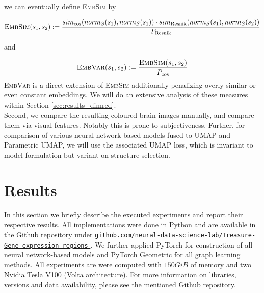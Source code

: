 \documentclass[]{article}
\renewcommand{\cite}{\citep}
\begin{document}
we can eventually define \textsc{EmbSim} by

\begin{equation}
	\label{equ:embsim}
	\textsc{EmbSim}(s_1,s_2):= \frac{sim_\text{cos}(norm_S(s_1), norm_S(s_1)) \cdot sim_\text{Resnik}(norm_S(s_1), norm_S(s_2))}{ P_{\text{Resnik}}}
\end{equation}

and

\begin{equation}
	\label{equ:embvar}
	\textsc{EmbVar}(s_1,s_2):= \frac{\textsc{EmbSim}(s_1, s_2)}{ P_{\text{cos}} }
\end{equation}
\textsc{EmbVar} is a direct extension of \textsc{EmbSim} additionally penalizing overly-similar or even constant embeddings. We will do an extensive analysis of these measures within Section \ref{sec:results_dimred}.\\
Second, we compare the resulting coloured brain images manually, and compare them via visual features. Notably this is prone to subjectiveness.
Further, for comparison of various neural network based models fused to UMAP and Parametric UMAP, we will use the associated UMAP loss, which is invariant to model formulation but variant on structure selection.



\newpage
\section{Results}
\label{sec:results}
In this section we briefly describe the executed experiments and report their respective results. All implementations were done in Python and are available in the Github repository under \href{https://github.com/neural-data-science-lab/Treasure-Gene-expression-regions}{\texttt{github.com/neural-data-science-lab/Treasure-Gene-expression-regions} }. We further applied PyTorch \cite{Pytorch} for construction of all neural network-based models and PyTorch Geometric \cite{PytorchGeometric} for all graph learning methods. All experiments are were computed with $150 GiB$ of memory and two Nvidia Tesla V100 (Volta architecture). For more information on libraries, versions and data availability, please see the mentioned Github repository.
\end{document}
